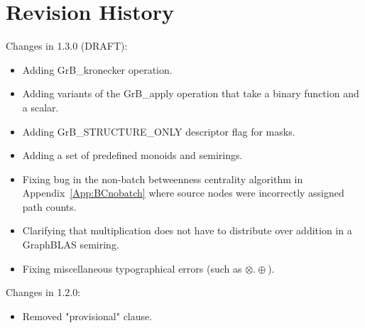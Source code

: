 \chapter{Revision History}
\label{Chp:RevHistory}

Changes in 1.3.0 (DRAFT):
\begin{itemize}
\item Adding {\sf GrB\_kronecker} operation.
\item Adding variants of the {\sf GrB\_apply} operation that take a binary function and a scalar.
\item Adding {\sf GrB\_STRUCTURE\_ONLY} descriptor flag for masks.
\item Adding a set of predefined monoids and semirings.
\item Fixing bug in the non-batch betweenness centrality algorithm in 
Appendix~\ref{App:BCnobatch} where source nodes were incorrectly assigned path counts.
\item Clarifying that multiplication does not have to distribute over addition in a GraphBLAS semiring.
\item Fixing miscellaneous typographical errors (such as $\otimes.\oplus$).
\end{itemize}


Changes in 1.2.0:
\begin{itemize}
\item Removed "provisional" clause.
\end{itemize}


